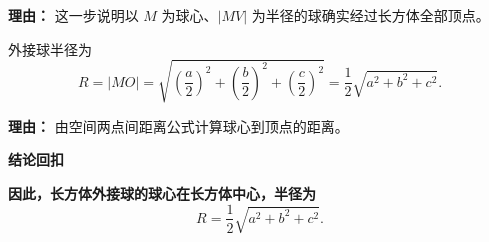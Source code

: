 \begin{proofbox}
\begin{description}[style=nextline, leftmargin=2.8em, labelsep=0.5em, itemsep=0.55em]
		      \par\textbf{理由：}
		      这一步说明以 $M$ 为球心、$|MV|$ 为半径的球确实经过长方体全部顶点。

		\item[\textbf{步骤四（计算半径）：}]
		      外接球半径为
		      \[
			      R=|MO|
			      =
			      \sqrt{
				      \left(\frac{a}{2}\right)^2
				      +
				      \left(\frac{b}{2}\right)^2
				      +
				      \left(\frac{c}{2}\right)^2
			      }
			      =
			      \frac{1}{2}\sqrt{a^2+b^2+c^2}.
		      \]
		      \par\textbf{理由：}
		      由空间两点间距离公式计算球心到顶点的距离。
	\end{description}

	\medskip
	\textbf{\textcolor{CProof}{结论回扣}}

	\textbf{因此，长方体外接球的球心在长方体中心，半径为}
	\[
		\boxed{R=\frac{1}{2}\sqrt{a^2+b^2+c^2}}.
	\]
\end{proofbox}